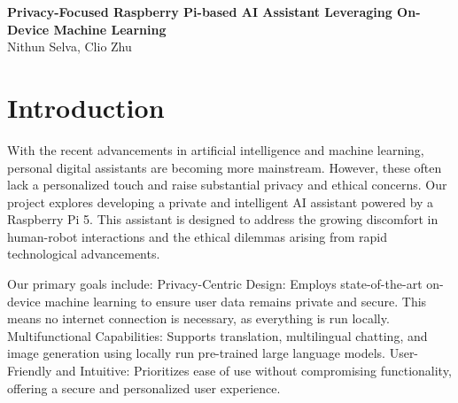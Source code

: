 \documentclass[12pt]{article}
\begin{document}
\thispagestyle{empty}

\begin{center}
{\Large \bf Privacy-Focused Raspberry Pi-based AI Assistant Leveraging On-Device Machine Learning}\\[3mm]

Nithun Selva, Clio Zhu\\[6mm]
\end{center}

\begin{abstract}
	With the recent advancements in artificial intelligence and machine learning, personal digital assistants are becoming more mainstream. However, these often lack a personalized touch and raise substantial privacy and ethical concerns. Our project explores developing a private and intelligent AI assistant powered by a Raspberry Pi 5. This assistant is designed to address the growing discomfort in human-robot interactions and the ethical dilemmas arising from rapid technological advancements. 

	Our primary goals include: 
	Privacy-Centric Design: Employs state-of-the-art on-device machine learning to ensure user data remains private and secure. This means no internet connection is necessary, as everything is run locally. 
	Multifunctional Capabilities: Supports translation, multilingual chatting, and image generation using locally run pre-trained large language models. 
	User-Friendly and Intuitive: Prioritizes ease of use without compromising functionality, offering a secure and personalized user experience. 
\end{abstract}

\section{Introduction}
With the recent advancements in artificial intelligence and machine learning, personal digital assistants are becoming more mainstream. However, these often lack a personalized touch and raise substantial privacy and ethical concerns. Our project explores developing a private and intelligent AI assistant powered by a Raspberry Pi 5. This assistant is designed to address the growing discomfort in human-robot interactions and the ethical dilemmas arising from rapid technological advancements. 

Our primary goals include: 
Privacy-Centric Design: Employs state-of-the-art on-device machine learning to ensure user data remains private and secure. This means no internet connection is necessary, as everything is run locally. 
Multifunctional Capabilities: Supports translation, multilingual chatting, and image generation using locally run pre-trained large language models. 
User-Friendly and Intuitive: Prioritizes ease of use without compromising functionality, offering a secure and personalized user experience. 
\end{document}
